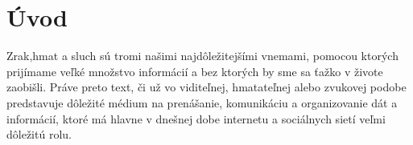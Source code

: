 \section{Úvod}









Zrak,hmat a sluch sú tromi našimi najdôležitejšími vnemami, pomocou ktorých prijímame veľké množstvo informácií a bez ktorých by sme sa ťažko v živote zaobišli. Práve preto text, či už vo viditeľnej, hmatateľnej alebo zvukovej podobe predstavuje dôležité médium na prenášanie, komunikáciu a organizovanie dát a informácií, ktoré má hlavne v dnešnej dobe internetu a sociálnych sietí veľmi dôležitú rolu.

